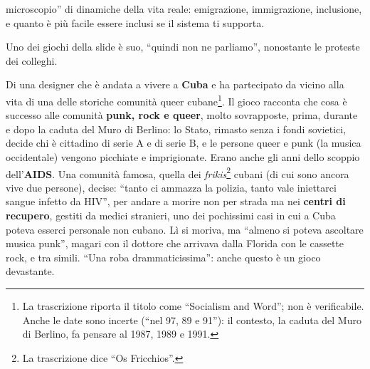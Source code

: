 \begin{description}
        microscopio'' di dinamiche della vita reale: emigrazione, immigrazione,
        inclusione, e quanto è più facile essere inclusi se il sistema ti
        supporta.
  \item[Il gioco di Ruggero.] Uno dei giochi della slide è suo, ``quindi non ne
        parliamo'', nonostante le proteste dei colleghi.
  \item[Un gioco su Cuba.] Di una designer che è andata a vivere a
        \textbf{Cuba} e ha partecipato da vicino alla vita di una delle storiche
        comunità queer cubane\footnote{La trascrizione riporta il titolo come
        ``Socialism and Word''; non è verificabile. Anche le date sono incerte
        (``nel 97, 89 e 91''): il contesto, la caduta del Muro di Berlino, fa
        pensare al 1987, 1989 e 1991.}. Il gioco racconta che cosa è successo
        alle comunità \textbf{punk, rock e queer}, molto sovrapposte, prima,
        durante e dopo la caduta del Muro di Berlino: lo Stato, rimasto senza i
        fondi sovietici, decide chi è cittadino di serie A e di serie B, e le
        persone queer e punk (la musica occidentale) vengono picchiate e
        imprigionate. Erano anche gli anni dello scoppio dell'\textbf{AIDS}. Una
        comunità famosa, quella dei \emph{frikis}\footnote{La trascrizione dice
        ``Os Fricchios''.} cubani (di cui sono ancora vive due persone), decise:
        ``tanto ci ammazza la polizia, tanto vale iniettarci sangue infetto da
        HIV'', per andare a morire non per strada ma nei \textbf{centri di
        recupero}, gestiti da medici stranieri, uno dei pochissimi casi in cui a
        Cuba poteva esserci personale non cubano. Lì si moriva, ma ``almeno si
        poteva ascoltare musica punk'', magari con il dottore che arrivava dalla
        Florida con le cassette rock, e tra simili. ``Una roba drammaticissima'':
        anche questo è un gioco devastante.
\end{description}

